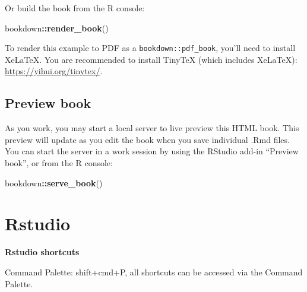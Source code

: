 \documentclass[
  a4paper,
  twoside,
  openright]{book}
\newenvironment{Shaded}{\begin{snugshade}}{\end{snugshade}}
\newcommand{\FunctionTok}[1]{\textcolor[rgb]{0.13,0.29,0.53}{\textbf{#1}}}
\newcommand{\NormalTok}[1]{#1}
\newcommand{\SpecialCharTok}[1]{\textcolor[rgb]{0.81,0.36,0.00}{\textbf{#1}}}
\theoremstyle{definition}
\theoremstyle{definition}
\theoremstyle{definition}
\theoremstyle{definition}
\theoremstyle{remark}
\begin{document}
Or build the book from the R console:

\begin{Shaded}
\begin{Highlighting}[]
\NormalTok{bookdown}\SpecialCharTok{::}\FunctionTok{render\_book}\NormalTok{()}
\end{Highlighting}
\end{Shaded}

To render this example to PDF as a \texttt{bookdown::pdf\_book}, you'll need to install XeLaTeX. You are recommended to install TinyTeX (which includes XeLaTeX): \url{https://yihui.org/tinytex/}.

\section{Preview book}\label{preview-book}

As you work, you may start a local server to live preview this HTML book. This preview will update as you edit the book when you save individual .Rmd files. You can start the server in a work session by using the RStudio add-in ``Preview book'', or from the R console:

\begin{Shaded}
\begin{Highlighting}[]
\NormalTok{bookdown}\SpecialCharTok{::}\FunctionTok{serve\_book}\NormalTok{()}
\end{Highlighting}
\end{Shaded}

\chapter{Rstudio}\label{rstudio}

\textbf{Rstudio shortcuts}

Command Palette: shift+cmd+P, all shortcuts can be accessed via the Command Palette.
\end{document}
